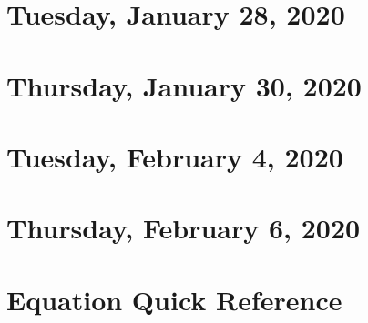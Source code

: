 \documentclass{../mynotes}
\begin{document}
\section{Tuesday, January 28, 2020}
    
\section{Thursday, January 30, 2020}
    

\section{Tuesday, February 4, 2020}
    
\section{Thursday, February 6, 2020}
    

\newpage
\section{Equation Quick Reference}
    
\end{document}
